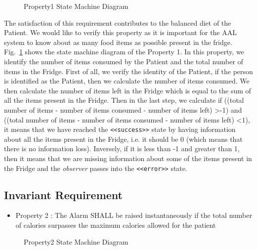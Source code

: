 \documentclass[a4paper,twoside]{article}
\begin{document}
\begin{figure}[!h]
  \centering
  {}
  \caption{Property1 State Machine Diagram}
  \label{fig:property1stm}
 \end{figure}
 
The satisfaction of this requirement contributes to the balanced diet of the Patient. We would like to verify this property as it is important for the AAL system to know about as many food items as possible present in the fridge. Fig.~\ref{fig:property1stm} shows the state machine diagram of the Property 1. In this property, we identify the number of items consumed by the Patient and the total number of items in the Fridge. First of all, we verify the identity of the Patient, if the person is identified as the Patient, then we calculate the number of items consumed. We then calculate the number of items left in the Fridge which is equal to the sum of all the items present in the Fridge. Then in the last step, we calculate if ((total number of items - number of items consumed - number of items left) \textgreater -1) and ((total number of items - number of items consumed - number of items left) \textless 1),
it means that we have reached the \texttt{<<success>>} state by having information about all the items present in the Fridge, i.e. it should be 0 (which means that there is no information loss). Inversely, if it is less than -1 and greater than 1, then it means that we are missing information about some of the items present in the Fridge and the \textit{observer} passes into the \texttt{<<error>>} state.


\subsection{Invariant Requirement}

\begin{itemize}
\item Property 2 : The Alarm SHALL be raised instantaneously if the total number of calories surpasses the maximum calories allowed for the patient 
\end{itemize}

\begin{figure}[!h]
  \centering
  {}
  \caption{Property2 State Machine Diagram}
  \label{fig:property3stm}
 \end{figure}
 
\end{document}
